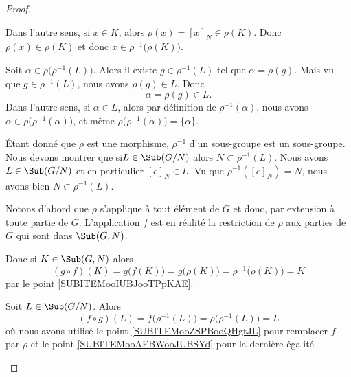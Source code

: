 \begin{proof}
\begin{subproof}
\begin{subproof}
			Dans l'autre sens, si \( x\in K\), alors \( \rho(x)=[x]_N\in \rho(K)\). Donc \( \rho(x)\in \rho(K)\) et donc \( x\in\rho^{-1}\big( \rho(K) \big)\).

			\spitem[Si \( L\in\Sub(G/N)\) alors \( \rho\big( \rho^{-1}(L) \big)=L\)]		\label{SUBITEMooAFBWooJUBSYd}
			Soit \( \alpha\in\rho\big( \rho^{-1}(L) \big)\). Alors il existe \( g\in \rho^{-1}(L)\) tel que \( \alpha=\rho(g)\). Mais vu que \( g\in\rho^{-1}(L)\), nous avons \( \rho(g)\in L\). Donc
			\begin{equation}
				\alpha=\rho(g)\in L.
			\end{equation}
			Dans l'autre sens, si \( \alpha\in L\), alors par définition de \( \rho^{-1}(\alpha)\), nous avons \( \alpha\in \rho\big( \rho^{-1}(\alpha) \big)\), et même \( \rho\big( \rho^{-1}(\alpha) \big)=\{ \alpha \}\).

					\label{SUBITEMooZSPBooQHgtJL}
			Étant donné que \( \rho\) est une morphisme, \( \rho^{-1}\) d'un sous-groupe est un sous-groupe. Nous devons montrer que si\( L\in\Sub(G/N)\) alors \( N\subset\rho^{-1}(L)\). Nous avons \( L\in\Sub(G/N)\) et en particulier \( [e]_N\in L\). Vu que \( \rho^{-1}([e]_N)=N\), nous avons bien \( N\subset\rho^{-1}(L)\).

			\spitem[\( g\circ f=\id\)]
			Notons d'abord que \( \rho\) s'applique à tout élément de \( G\) et donc, par extension à toute partie de \( G\). L'application \( f\) est en réalité la restriction de \( \rho\) aux parties de \( G\) qui sont dans \( \Sub(G,N)\).

			Donc si \( K\in \Sub(G,N)\) alors
			\begin{equation}
				(g\circ f)(K)=g\big( f(K) \big)=g\big( \rho(K) \big)=\rho^{-1}\big( \rho(K) \big)=K
			\end{equation}
			par le point \ref{SUBITEMooIUBJooTPpKAE}.

			\spitem[\( f\circ g=\id\)]
			Soit \( L\in \Sub(G/N)\). Alors
			\begin{equation}
				(f\circ g)(L)=f\big( \rho^{-1}(L) \big)=\rho\big( \rho^{-1}(L) \big)=L
			\end{equation}
			où nous avons utilisé le point \ref{SUBITEMooZSPBooQHgtJL} pour remplacer \( f\) par \( \rho\) et le point \ref{SUBITEMooAFBWooJUBSYd} pour la dernière égalité.


\end{subproof}
\end{subproof}
\end{proof}
